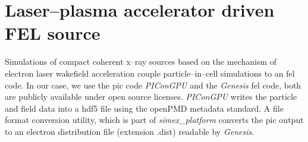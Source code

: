 \documentclass[12pt]{scrartcl}
\begin{document}
%
\section{Laser--plasma accelerator driven FEL source}\label{sec:lwfa_source}
%
Simulations of compact coherent x--ray sources based on the mechanism of
electron laser wakefield acceleration  couple particle--in--cell
simulations to an \gls{fel} code. In our case, we use the \gls{pic} code \textit{PIConGPU}
and the \textit{Genesis} \gls{fel} code, both are publicly available under open source licenses.
\textit{PIConGPU} writes the particle and field data
into a hdf5 file using the openPMD \cite{Huebl2017} metadata standard. A file format conversion utility, which is part of
\textit{simex\_platform} converts the \gls{pic} output to an electron distribution
file (extension .dist) readable by \textit{Genesis}.




\FloatBarrier

\printbibliography[notkeyword=submitted, notkeyword=inpreparation, notkeyword=report, notkeyword=zenodo, title={Journal articles}]
%
\printbibliography[keyword=submitted, title={Submitted articles}]
%
\printbibliography[keyword=inpreparation, title={Articles in preparation}]
%
\printbibliography[keyword=eucall, keyword=report, title={EUCALL reports}]
%
\printbibliography[keyword=zenodo, title={Zenodo depositions}]
\end{document}
